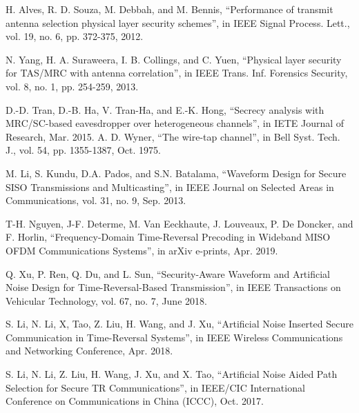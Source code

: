 \documentclass[a4paper,11pt]{article}
\begin{document}
\begin{thebibliography}{1}
 
 
 
 
 
 H. Alves, R. D. Souza, M. Debbah, and M. Bennis, ``Performance of transmit antenna selection physical layer security schemes'', in IEEE Signal Process. Lett., vol. 19, no. 6, pp. 372-375, 2012.


 N. Yang, H. A. Suraweera, I. B. Collings, and C. Yuen, ``Physical layer security for TAS/MRC with antenna correlation'', in IEEE Trans. Inf. Forensics Security, vol. 8, no. 1, pp. 254-259, 2013.

D.-D. Tran, D.-B. Ha, V. Tran-Ha, and E.-K. Hong, ``Secrecy analysis with MRC/SC-based eavesdropper over heterogeneous channels'', in IETE Journal of Research, Mar. 2015. 
 A. D. Wyner, ``The wire-tap channel'', in Bell Syst. Tech. J., vol. 54, pp. 1355-1387, Oct. 1975.


 M. Li, S. Kundu, D.A. Pados, and S.N. Batalama, ``Waveform Design for Secure SISO Transmissions and Multicasting'', in IEEE Journal on Selected Areas in Communications, vol. 31, no. 9, Sep. 2013.

 T-H. Nguyen, J-F. Determe, M. Van Eeckhaute, J. Louveaux, P. De Doncker, and F. Horlin, ``Frequency-Domain Time-Reversal Precoding in Wideband MISO OFDM Communications Systems'', in arXiv e-prints, Apr. 2019.

 Q. Xu, P. Ren, Q. Du, and L. Sun, ``Security-Aware Waveform and Artificial Noise Design for Time-Reversal-Based Transmission'', in IEEE Transactions on Vehicular Technology, vol. 67, no. 7, June 2018.

 S. Li, N. Li, X, Tao, Z. Liu, H. Wang, and J. Xu, ``Artificial Noise Inserted Secure Communication in Time-Reversal Systems'', in IEEE Wireless Communications and Networking Conference, Apr. 2018.

 S. Li, N. Li, Z. Liu, H. Wang, J. Xu, and X. Tao, ``Artificial Noise Aided Path Selection for Secure TR Communications'', in IEEE/CIC International Conference on Communications in China (ICCC), Oct. 2017.


\end{thebibliography}
\end{document}
